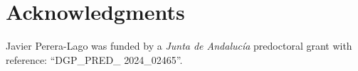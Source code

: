 \documentclass[a4paper,10pt]{article}
\begin{document}
\section*{Acknowledgments}

\noindent Javier Perera-Lago was funded by a \textit{Junta de Andalucía} predoctoral grant with reference:
``DGP\_PRED\_ 2024\_02465''.









\end{document}

